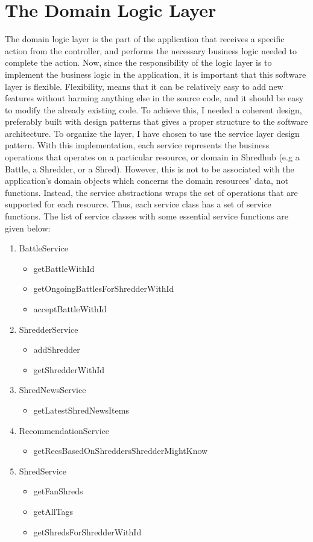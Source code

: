 \section{The Domain Logic Layer}
The domain logic layer is the part of the application that receives a specific action from the controller, and performs the necessary business logic needed to complete the action. Now, since the responsibility of the logic layer is to implement the business logic in the application, it is important that this software layer is flexible. Flexibility, means that it can be relatively easy to add new features without harming anything else in the source code, and it should be easy to modify the already existing code. To achieve this, I needed a coherent design, preferably built with design patterns that gives a proper structure to the software architecture. To organize the layer, I have chosen to use the service layer design pattern\cite{poea}. With this implementation, each service represents the business operations that operates on a particular resource, or domain in Shredhub (e.g a Battle, a Shredder, or a Shred). However, this is not to be associated with the application's domain objects which concerns the domain resources' data, not functions. Instead, the service abstractions wraps the set of operations that are supported for each resource. Thus, each service class has a set of service functions. The list of service classes with some essential service functions are given below:
		\begin{enumerate}
			\item{} BattleService 
				\begin{itemize}
					\item{} getBattleWithId
					\item{} getOngoingBattlesForShredderWithId
					\item{} acceptBattleWithId
				\end{itemize}
			\item{} ShredderService
				\begin{itemize}
					\item{} addShredder
					\item{} getShredderWithId
				\end{itemize}	
			\item{} ShredNewsService
				\begin{itemize}
					\item{}getLatestShredNewsItems
				\end{itemize}
			\item{} RecommendationService
				\begin{itemize}
					\item{}getRecsBasedOnShreddersShredderMightKnow
				\end{itemize}
			\item{} ShredService
				\begin{itemize}
					\item{} getFanShreds
					\item{} getAllTags
					\item{} getShredsForShredderWithId
				\end{itemize}
		\end{enumerate}

